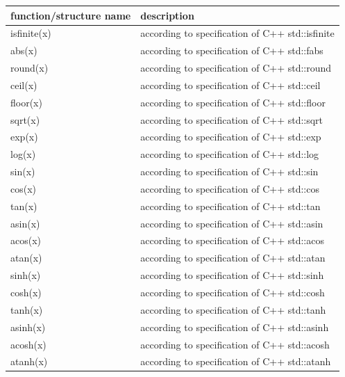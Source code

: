 \begin{center}
\footnotesize
\begin{longtable}{| p{8cm} | p{8cm} |} 
\hline
{\bf function/structure name} & {\bf description}\\ \hline
  isfinite(x) & according to specification of C++ std::isfinite\\ \hline 
  abs(x) & according to specification of C++ std::fabs\\ \hline 
  round(x) & according to specification of C++ std::round\\ \hline 
  ceil(x) & according to specification of C++ std::ceil\\ \hline 
  floor(x) & according to specification of C++ std::floor\\ \hline 
  sqrt(x) & according to specification of C++ std::sqrt\\ \hline 
  exp(x) & according to specification of C++ std::exp\\ \hline 
  log(x) & according to specification of C++ std::log\\ \hline 
  sin(x) & according to specification of C++ std::sin\\ \hline 
  cos(x) & according to specification of C++ std::cos\\ \hline 
  tan(x) & according to specification of C++ std::tan\\ \hline 
  asin(x) & according to specification of C++ std::asin\\ \hline 
  acos(x) & according to specification of C++ std::acos\\ \hline 
  atan(x) & according to specification of C++ std::atan\\ \hline 
  sinh(x) & according to specification of C++ std::sinh\\ \hline 
  cosh(x) & according to specification of C++ std::cosh\\ \hline 
  tanh(x) & according to specification of C++ std::tanh\\ \hline 
  asinh(x) & according to specification of C++ std::asinh\\ \hline 
  acosh(x) & according to specification of C++ std::acosh\\ \hline 
  atanh(x) & according to specification of C++ std::atanh\\ \hline 
\end{longtable}
\end{center}

